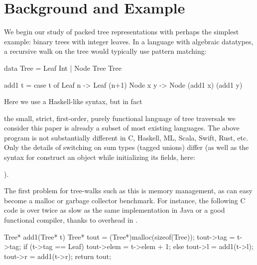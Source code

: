 \documentclass[a4paper,english]{lipics-v2016}
\newif\ifcurly
\begin{document}
\section{Background and Example}\label{sec:background}

We begin our study of packed tree representations with perhaps the
simplest example: binary trees with
integer leaves.
%
In a language with algebraic datatypes,
a recursive walk on
the tree would typically use pattern matching:

\ifcurly
\begin{code}[language=c]
type Tree = Leaf(Int) | Node(Tree,Tree);

fun add1(t) {
  match(t) {
    Leaf(n):   return Leaf(n+1);
    Node(x,y): return Node(add1(x),add1(y));
  }}
\end{code}
\else
\begin{code}
 data Tree = Leaf Int | Node Tree Tree
  
 add1 t = case t of
            Leaf n   -> Leaf (n+1)
            Node x y -> Node (add1 x) (add1 y)
\end{code}
\fi

\ifcurly
In fact,
\else
Here we use a Haskell-like syntax, but in fact
\fi
 the small, strict, first-order, purely functional language of tree traversals
we consider this paper is already a subset of most existing languages.
The above program is not substantially different in C, Haskell, ML, Scala,
Swift, Rust, etc.  Only the details of switching on sum types (tagged unions)
differ (as well as the syntax for construct an object while initializing its
fields, here: 
\ifcurly
\il{Node(e1,e2)}).
\else
{}).
\fi


The first problem for tree-walks such as this is memory management, as 
can easy become a malloc or garbage collector benchmark.  For instance, the
following C code is over twice as slow as the same implementation in Java or a
good functional compiler, thanks to overhead in .

\begin{cpp}
  Tree* add1(Tree* t) {
    Tree* tout = (Tree*)malloc(sizeof(Tree));
    tout->tag = t->tag;
    if (t->tag == Leaf) {
      tout->elem = t->elem + 1;
    } else {
      tout->l = add1(t->l);
      tout->r = add1(t->r);
    }
    return tout;
  }
\end{cpp}
\end{document}

